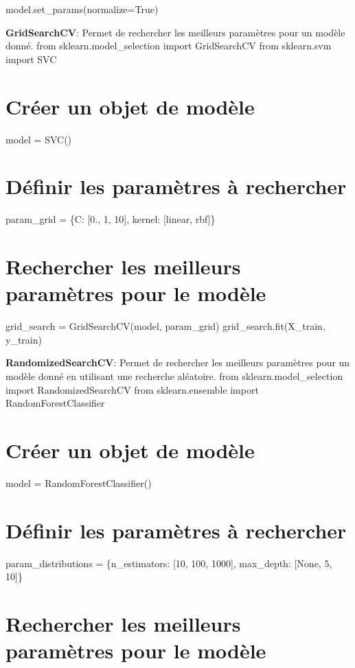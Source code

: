 model.\+set\+\_\+params(normalize=True)
\begin{DoxyEnumerate}
\item {\bfseries Grid\+Search\+CV}\+: Permet de rechercher les meilleurs paramètres pour un modèle donné. from sklearn.\+model\+\_\+selection import Grid\+Search\+CV from sklearn.\+svm import S\+VC \section*{Créer un objet de modèle}
\end{DoxyEnumerate}

model = S\+V\+C() \section*{Définir les paramètres à rechercher}

param\+\_\+grid = \{\textquotesingle{}C\textquotesingle{}\+: \mbox{[}0., 1, 10\mbox{]}, \textquotesingle{}kernel\textquotesingle{}\+: \mbox{[}\textquotesingle{}linear\textquotesingle{}, \textquotesingle{}rbf\textquotesingle{}\mbox{]}\} \section*{Rechercher les meilleurs paramètres pour le modèle}

grid\+\_\+search = Grid\+Search\+C\+V(model, param\+\_\+grid) grid\+\_\+search.\+fit(\+X\+\_\+train, y\+\_\+train)


\begin{DoxyEnumerate}
\item {\bfseries Randomized\+Search\+CV}\+: Permet de rechercher les meilleurs paramètres pour un modèle donné en utilisant une recherche aléatoire. from sklearn.\+model\+\_\+selection import Randomized\+Search\+CV from sklearn.\+ensemble import Random\+Forest\+Classifier \section*{Créer un objet de modèle}
\end{DoxyEnumerate}

model = Random\+Forest\+Classifier() \section*{Définir les paramètres à rechercher}

param\+\_\+distributions = \{\textquotesingle{}n\+\_\+estimators\textquotesingle{}\+: \mbox{[}10, 100, 1000\mbox{]}, \textquotesingle{}max\+\_\+depth\textquotesingle{}\+: \mbox{[}None, 5, 10\mbox{]}\} \section*{Rechercher les meilleurs paramètres pour le modèle}

